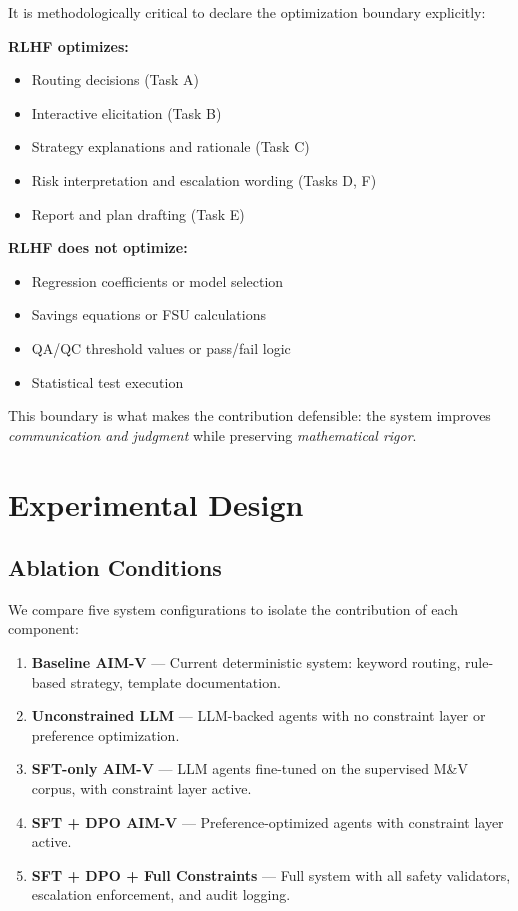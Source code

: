 \documentclass[11pt,a4paper]{article}
\begin{document}
It is methodologically critical to declare the optimization boundary explicitly:

\textbf{RLHF optimizes:}
\begin{itemize}
    \item Routing decisions (Task A)
    \item Interactive elicitation (Task B)
    \item Strategy explanations and rationale (Task C)
    \item Risk interpretation and escalation wording (Tasks D, F)
    \item Report and plan drafting (Task E)
\end{itemize}

\textbf{RLHF does not optimize:}
\begin{itemize}
    \item Regression coefficients or model selection
    \item Savings equations or FSU calculations
    \item QA/QC threshold values or pass/fail logic
    \item Statistical test execution
\end{itemize}

This boundary is what makes the contribution defensible: the system improves \emph{communication and judgment} while preserving \emph{mathematical rigor}.

\section{Experimental Design}

\subsection{Ablation Conditions}

We compare five system configurations to isolate the contribution of each component:

\begin{enumerate}
    \item \textbf{Baseline AIM-V} — Current deterministic system: keyword routing, rule-based strategy, template documentation.
    \item \textbf{Unconstrained LLM} — LLM-backed agents with no constraint layer or preference optimization.
    \item \textbf{SFT-only AIM-V} — LLM agents fine-tuned on the supervised M\&V corpus, with constraint layer active.
    \item \textbf{SFT + DPO AIM-V} — Preference-optimized agents with constraint layer active.
    \item \textbf{SFT + DPO + Full Constraints} — Full system with all safety validators, escalation enforcement, and audit logging.
\end{enumerate}
\end{document}
